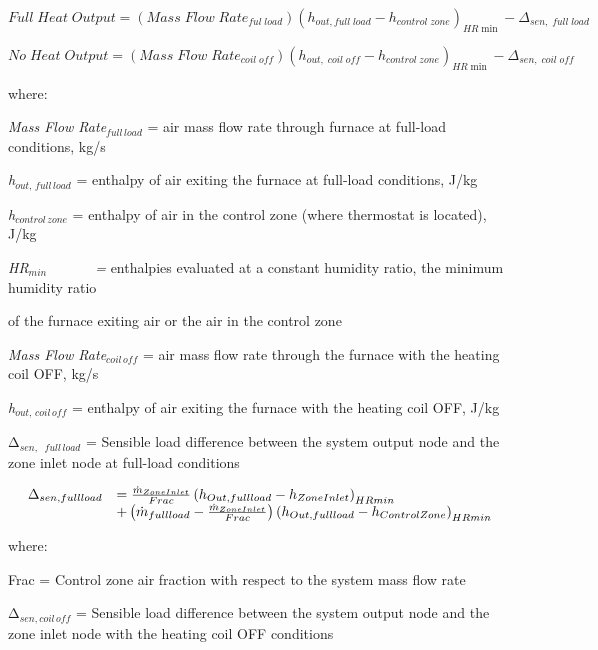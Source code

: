 \begin{equation}
Full\;Heat\;Output = (Mass\;Flow\;Rat{e_{ful\;load}}){({h_{out,full\;load}} - {h_{control\;zone}})_{HR\min }} - {\Delta_{sen,\;full\;load}}
\end{equation}

\begin{equation}
No\;Heat\;Output = (Mass\;Flow\;Rat{e_{coil\;off}}){({h_{out,\;coil\;off}} - {h_{control\;zone}})_{HR\min }} - {\Delta_{sen,\;coil\;off}}
\end{equation}

where:

\emph{Mass Flow Rate\(_{full\,load}\)} = air mass flow rate through furnace at full-load conditions, kg/s

\emph{h\(_{out,\,full\,load}\)} = enthalpy of air exiting the furnace at full-load conditions, J/kg

\emph{h\(_{control\, zone}\)} = enthalpy of air in the control zone (where thermostat is located), J/kg

\emph{HR\(_{min}\)~~~~~~ =} enthalpies evaluated at a constant humidity ratio, the minimum humidity ratio

of the furnace exiting air or the air in the control zone

\emph{Mass Flow Rate\(_{coil\, off}\)} = air mass flow rate through the furnace with the heating coil OFF, kg/s

\emph{h\(_{out,\, coil\, off}\)} = enthalpy of air exiting the furnace with the heating coil OFF, J/kg

Δ\(_{sen,}\) \emph{\(_{full\, load}\)} = Sensible load difference between the system output node and the zone inlet node at full-load conditions

\begin{equation}
  \begin{array}{rl}
    \Delta_{sen,full load} &= \frac{\dot{m}_{ZoneInlet}}{Frac} \PB{h_{Out,full load} - h_{ZoneInlet}}_{HRmin} \\
                           &+ \PB{\dot{m}_{full load} - \frac{\dot{m}_{ZoneInlet}}{Frac}} \PB{h_{Out,full load} - h_{ControlZone}}_{HRmin}
  \end{array}
\end{equation}

where:

Frac = Control zone air fraction with respect to the system mass flow rate

Δ\(_{sen,coil\, off}\) = Sensible load difference between the system output node and the zone inlet node with the heating coil OFF conditions

